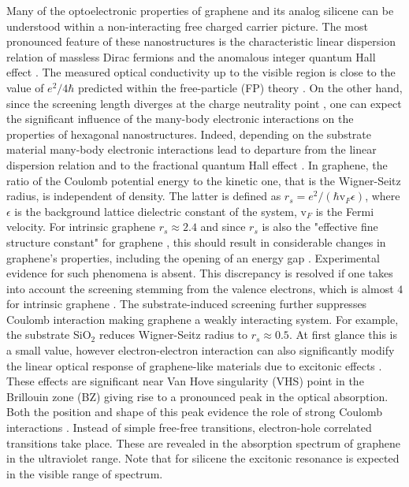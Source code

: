 \documentclass[reprint, superscriptaddress,  aps, pra]{revtex4-2}
\begin{document}
Many of the optoelectronic properties of graphene \cite{Castro} and its
analog silicene \cite{Sil1,Sil2,Sil3} can be understood within a
non-interacting free charged carrier picture. The most pronounced feature of
these nanostructures is the characteristic linear dispersion relation of
massless Dirac fermions \cite{Novoselov} and the anomalous integer quantum
Hall effect \cite{Zhang}. The measured optical conductivity up to the
visible region is close to the value of $e^{2}/4\hbar $ \cite{Mak1}
predicted within the free-particle (FP) theory \cite{Stauber}. On the other
hand, since the screening length diverges at the charge neutrality point 
\cite{Castro}, one can expect the significant influence of the many-body
electronic interactions on the properties of hexagonal nanostructures.
Indeed, depending on the substrate material many-body electronic
interactions lead to departure from the linear dispersion relation \cite%
{Elias,Hwang,Park} and to the fractional quantum Hall effect \cite%
{Bolotin,Du0}. In graphene, the ratio of the Coulomb potential energy to the
kinetic one, that is the Wigner-Seitz radius, is independent of density. The
latter is defined as $r_{s}=e^{2}/(\hbar \mathrm{v}_{F}\epsilon )$, where $%
\epsilon $ is the background lattice dielectric constant of the system, $%
\mathrm{v}_{F}$ is the Fermi velocity. For intrinsic graphene $r_{s}\approx
2.4$ and since $r_{s}$ is also the "effective fine structure constant" for
graphene \cite{Elias}, this should result in considerable changes in
graphene's properties, including the opening of an energy gap \cite%
{Khveshchenko,Gorbar,Drut}. Experimental evidence for such phenomena is
absent. This discrepancy is resolved if one takes into account the screening
stemming from the valence electrons, which is almost $4$ for intrinsic
graphene \cite{Das}. The substrate-induced screening further suppresses
Coulomb interaction making graphene a weakly interacting system. For
example, the substrate SiO$_{2}$ reduces Wigner-Seitz radius to $%
r_{s}\approx 0.5$. At first glance this is a small value, however
electron-electron interaction can also significantly modify the linear
optical response of graphene-like materials due to excitonic effects \cite%
{Yang,Kravets,Mak,Jornada,Peres,Mishchenko,exc0,exc1,exc2}. These effects
are significant near Van Hove singularity (VHS) \cite{Van Hove} point in the
Brillouin zone (BZ) giving rise to a pronounced peak in the optical
absorption. Both the position and shape of this peak evidence the role of
strong Coulomb interactions \cite{Yang,Kravets,Mak,Jornada}. Instead of
simple free-free transitions, electron-hole correlated transitions take
place. These are revealed in the absorption spectrum of graphene in the
ultraviolet range. Note that for silicene the excitonic resonance is
expected in the visible range of spectrum.
\end{document}
